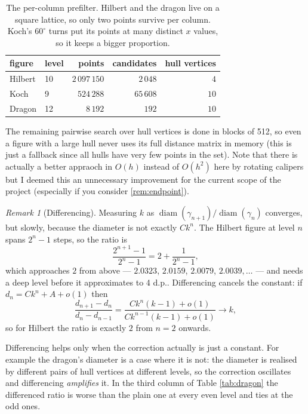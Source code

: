 \documentclass[11pt, a4paper]{article}
\theoremstyle{plain}
\theoremstyle{definition}
\theoremstyle{remark}
\newtheorem{remark}[theorem]{Remark}
\DeclareMathOperator{\diam}{diam}
\begin{document}
\begin{table}[H]
\centering
\begin{tabular}{llrrr}
\hline
figure & level & points & candidates & hull vertices \\
\hline
Hilbert & 10 & $2\,097\,150$ & $2\,048$ & $4$ \\
Koch    &  9 & $524\,288$    & $65\,608$ & $10$ \\
Dragon  & 12 & $8\,192$      & $192$     & $10$ \\
\hline
\end{tabular}
\caption{The per-column prefilter. Hilbert and the dragon live on a square lattice, so only two points survive per column. 
Koch's $60^\circ$ turns put its points at many distinct $x$ values, so it keeps a bigger proportion.}
\label{tab:hull}
\end{table}

\noindent The remaining pairwise search over hull vertices is done in blocks of 512, so even a figure with a large hull never uses its full distance matrix in memory (this is just a fallback since all hulls have very few points in the set).
Note that there is actually a better appraoch in $O(h)$ instead of $O(h^2)$ here by rotating calipers but I deemed this an unnecessary improvement for the current scope of the project (especially if you consider \ref{rem:endpoint}).

\begin{remark}[Differencing]
\label{rem:differencing}
    Measuring $k$ as $\diam(\gamma_{n+1})/\diam(\gamma_n)$ converges, but
    slowly, because the diameter is not exactly $Ck^n$. The Hilbert figure at
    level $n$ spans $2^n-1$ steps, so the ratio is
    \[
      \frac{2^{n+1}-1}{2^n-1}=2+\frac{1}{2^n-1},
    \]
    which approaches $2$ from above --- $2.0323$, $2.0159$, $2.0079$,
    $2.0039,\dots$ --- and needs a deep level before it approximates to 4 d.p.. 
    Differencing cancels the constant: if $d_n=Ck^n+A+o(1)$ then
    \[
      \frac{d_{n+1}-d_n}{d_n-d_{n-1}}
      =\frac{Ck^n(k-1)+o(1)}{Ck^{n-1}(k-1)+o(1)}\longrightarrow k,
    \]
    so for Hilbert the ratio is exactly $2$ from $n=2$ onwards.

    Differencing helps only when the correction actually is just a constant.
    For example the dragon's diameter is a case where it is not: the diameter is realised by different pairs of hull vertices at different levels, so the correction oscillates and differencing \emph{amplifies} it. 
    In the third column of Table \ref{tab:dragon} the differenced ratio is worse than the plain one at
    every even level and ties at the odd ones.
\end{remark}
\end{document}
